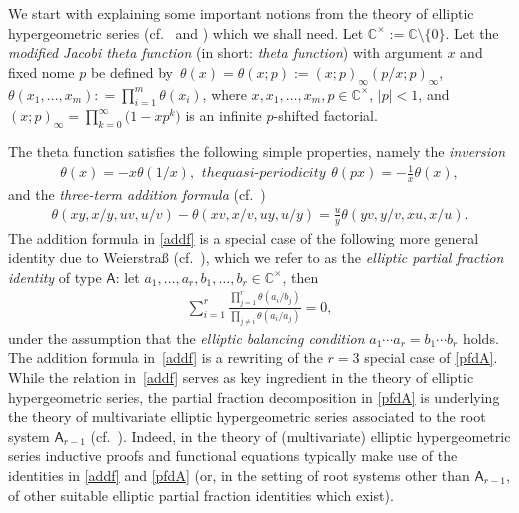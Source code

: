 \documentclass[10pt,a4paper]{amsart}
\numberwithin{equation}{section}
\theoremstyle{definition}
\newcommand{\ta}{\theta}
\newcommand{\C}{\mathbb C}
\begin{document}
We start with explaining some important notions from the
theory of elliptic hypergeometric series (cf.\ \cite[Chapter~11]{GR}
and \cite{R21}) which we shall need.
Let $\C^\times:=\C\setminus\{0\}$. Let the \textit{modified
Jacobi theta function} (in short: \textit{theta function}) with
argument $x$ and fixed nome $p$ be defined by~${
\ta(x)=\ta (x; p):= (x; p)_\infty (p/x; p)_\infty}$, $
\ta (x_1, \dots, x_m): = \prod^m_{i=1} \ta (x_i)$,
where $ x, x_1, \dots, x_m, p\in \C^\times$, ${|p| < 1}$, and
$(x; p)_\infty=\prod^\infty_{k=0}\bigl(1-x p^k\bigr)$ is an infinite
$p$-shifted factorial.

The theta function satisfies the following simple properties,
namely the \textit{inversion}
\begin{subequations}
\begin{gather}\label{eq:inv}
\ta(x)=-x \ta(1/x),
\end{gather}
the \textit{quasi-periodicity}
\begin{gather}\label{p1id}
\ta(px)=-\frac 1x \ta(x),
\end{gather}
\end{subequations}
and the \textit{three-term addition formula}
(cf.\ \cite[p.~451, Example 5]{WW})
\begin{gather}\label{addf}
\ta(xy,x/y,uv,u/v)-\ta(xv,x/v,uy,u/y)
=\frac uy \ta(yv,y/v,xu,x/u).
\end{gather}
The addition formula in \eqref{addf} is a special case of the
following more general identity due to Weierstra{\ss}
(cf.\ \cite[p.~451, Example 3]{WW}),
which we refer to as the \textit{elliptic partial fraction identity}
of type $\mathsf A$:
let $a_1,\dots,a_r,b_1,\dots,b_r\in\C^\times$, then
\begin{gather}\label{pfdA}
\sum_{i=1}^r\frac{\prod_{j=1}^r\ta(a_i/b_j)}{\prod_{j\neq i}\ta(a_i/a_j)}=0,
\end{gather}
under the assumption that the \textit{elliptic balancing condition}
$a_1\cdots a_r=b_1\cdots b_r$ holds.
The addition formula in~\eqref{addf} is a rewriting of the $r=3$
special case of \eqref{pfdA}. While the relation in~\eqref{addf}
serves as key ingredient in the theory of elliptic hypergeometric
series, the partial fraction decomposition in \eqref{pfdA}
is underlying the theory of multivariate elliptic hypergeometric
series associated to the root system $\mathsf A_{r-1}$
(cf.\ \cite{R04,RW}). Indeed, in the theory of (multivariate)
elliptic hypergeometric series inductive proofs and functional
equations typically make use of the identities in \eqref{addf}
and \eqref{pfdA}
(or, in the setting of root systems other than $\mathsf A_{r-1}$,
of other suitable elliptic partial fraction identities which exist).
\end{document}

